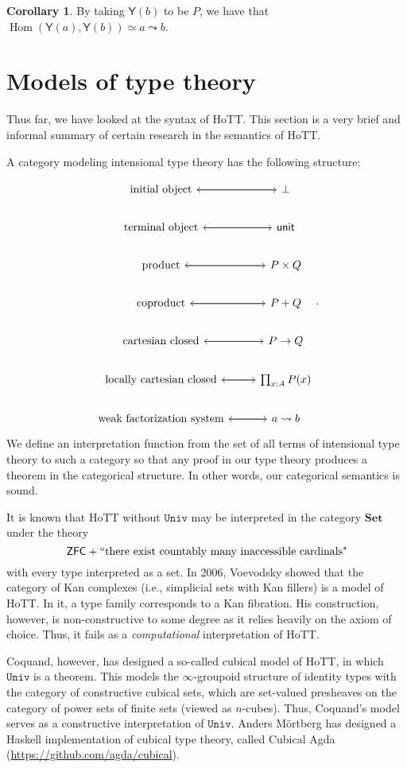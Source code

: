 \documentclass[10pt,letterpaper,cm]{nupset}
\theoremstyle{definition}
\theoremstyle{theorem}
\newtheorem{corollary}[definition]{Corollary}
\theoremstyle{remark}
\newcommand{\1}{\mathbf{1}}
\newcommand{\univ}{\mathtt{Univ}}
\newcommand{\0}{\vec 0}
\DeclareMathOperator{\Hom}{Hom}
\begin{document}
\begin{corollary}
By taking $\mathsf{Y}(b)$ to be $P$, we have that $\Hom(\mathsf{Y}(a), \mathsf{Y}(b)) \simeq a \leadsto b$.
\end{corollary}

\section{Models of type theory}

Thus far, we have looked at the syntax of HoTT. This section is a very brief and informal summary of certain research in the semantics of HoTT.

\medskip

A category modeling intensional type theory has the following structure:

\[
\begin{tikzcd}
\text{initial object} \arrow[r] & \bot \arrow[l] \\
\text{terminal object} \arrow[r] & \mathsf{unit} \arrow[l] \\
\text{product} \arrow[r] & P\times Q \arrow[l] \\
\text{coproduct} \arrow[r] & P + Q \arrow[l] \\
\text{cartesian closed} \arrow[r] & P \to Q \arrow[l] \\
\text{locally cartesian closed} \arrow[r] & \prod_{x:A}P(x) \arrow[l] \\
\text{weak factorization system} \arrow[r] & {a\leadsto b} \arrow[l]
\end{tikzcd}.
\]
We define an interpretation function from the set of all terms of intensional type theory to such a category so that any proof in our type theory produces a theorem in the categorical structure. In other words, our categorical semantics is sound.

It is known that HoTT without $\univ$ may be interpreted in the category $\mathbf{Set}$ under the theory $$\mathsf{ZFC} + ``\text{there exist countably many inaccessible cardinals"}$$ with every type interpreted as a set. In 2006, Voevodsky showed that the category of Kan complexes (i.e., simplicial sets with Kan fillers) is a model of HoTT.  In it, a type family corresponds to a Kan fibration.  His construction, however, is non-constructive to some degree as it relies heavily on the axiom of choice. Thus, it fails as a \emph{computational} interpretation of HoTT.

Coquand, however, has designed a so-called cubical model of HoTT, in which $\univ$ is a theorem. This models the $\infty$-groupoid structure of identity types with the category of constructive cubical sets, which are set-valued presheaves on the category of power sets of finite sets (viewed as $n$-cubes). Thus, Coquand's model serves as a constructive interpretation of $\univ$.  
Anders M\"ortberg has designed a Haskell implementation of cubical type theory, called Cubical Agda (\url{https://github.com/agda/cubical}).
\end{document}
